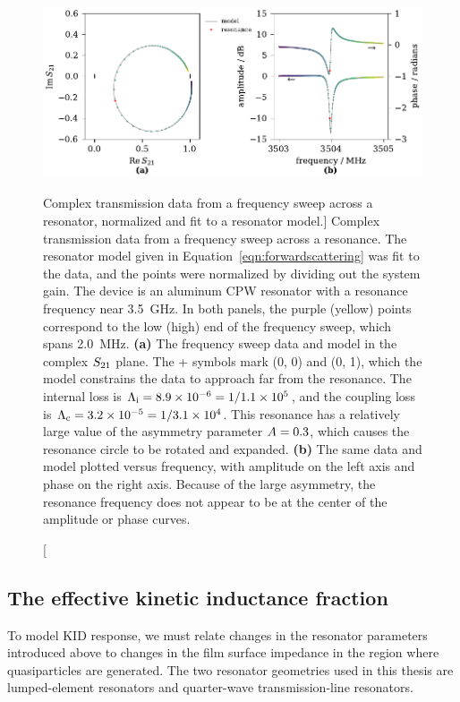 \begin{figure}[tb]
\centering
\includegraphics[width=\textwidth]{theory/example_resonator_fit_amplitude_phase_and_normalized.pdf}
\caption
[Complex transmission data from a frequency sweep across a resonator, normalized and fit to a resonator model.]
{
Complex transmission data from a frequency sweep across a resonance.
The resonator model given in Equation~\ref{eqn:forwardscattering} was fit to the data, and the points were normalized by dividing out the system gain.
The device is an aluminum CPW resonator with a resonance frequency near \SI{3.5}{GHz}.
In both panels, the purple (yellow) points correspond to the low (high) end of the frequency sweep, which spans \SI{2.0}{MHz}.
\textbf{(a)} 
The frequency sweep data and model in the complex $S_{21}$ plane.
The + symbols mark (0, 0) and (0, 1), which the model constrains the data to approach far from the resonance.
The internal loss is
$\Lambda_{\mathrm{i}} = \num{8.9e-6} = 1 / \num{1.1e5}$,
and the coupling loss is
$\Lambda_{\mathrm{c}} = \num{3.2e-5} = 1 / \num{3.1e4}$.
This resonance has a relatively large value of the asymmetry parameter
$A = 0.3$, which causes the resonance circle to be rotated and expanded.
\textbf{(b)} 
The same data and model plotted versus frequency, with amplitude on the left axis and phase on the right axis.
Because of the large asymmetry, the resonance frequency does not appear to be at the center of the amplitude or phase curves.
}
\label{fig:example_resonator_fit_amplitude_phase_and_normalized}
\end{figure}


\subsection{The effective kinetic inductance fraction}
\label{sec:theory.resonator.kifraction}

To model KID response, we must relate changes in the resonator parameters introduced above to changes in the film surface impedance in the region where quasiparticles are generated.
The two resonator geometries used in this thesis are lumped-element resonators and quarter-wave transmission-line resonators.

